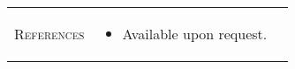 \documentclass[11pt]{article}
\newcommand{\cellone}{3.5cm} %
\newcommand{\celltwo}{11cm}
\newcommand{\cellthree}{4cm}
\begin{document}
\begin{tabularx}{\textwidth}{p{\cellone} p{\celltwo} p{\cellthree}}
  \parbox[t][0cm]{\cellone}{R\textsc{eferences}} & \parbox[t][0cm]{6cm}{
    \vspace{-0.65cm}
    
    \begin{itemize}
      \item \parbox[t]{10cm}{Available upon request.}
    \end{itemize}
  }
  
\end{tabularx}
\end{document}
